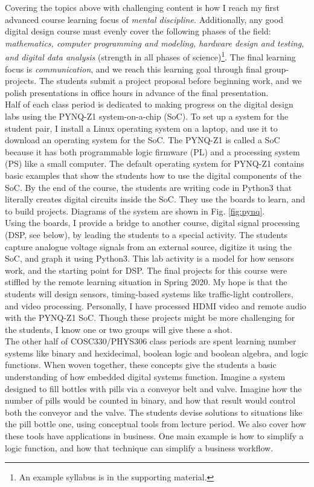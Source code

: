 \documentclass[../../../main.tex]{subfiles}
\begin{document}
Covering the topics above with challenging content is how I reach my first advanced course learning focus of \textit{mental discipline.}  Additionally, any good digital design course must evenly cover the following phases of the field: \textit{mathematics, computer programming and modeling, hardware design and testing, and digital data analysis} (strength in all phases of science)\footnote{An example syllabus is in the supporting material.}.  The final learning focus is \textit{communication}, and we reach this learning goal through final group-projects.  The students submit a project proposal before beginning work, and we polish presentations in office hours in advance of the final presentation.
\\
\vspace{0.25cm}
Half of each class period is dedicated to making progress on the digital design labs using the PYNQ-Z1 system-on-a-chip (SoC).  To set up a system for the student pair, I install a Linux operating system on a laptop, and use it to download an operating system for the SoC.  The PYNQ-Z1 is called a SoC because it has both programmable logic firmware (PL) and a processing system (PS) like a small computer.  The default operating system for PYNQ-Z1 contains basic examples that show the students how to use the digital components of the SoC.  By the end of the course, the students are writing code in Python3 that literally creates digital circuits inside the SoC.  They use the boards to learn, and to build projects.  Diagrams of the system are shown in Fig. \ref{fig:pynq}.
\\
\vspace{0.25cm}
Using the boards, I provide a bridge to another course, digital signal processing (DSP, see below), by leading the students to a special activity.  The students capture analogue voltage signals from an external source, digitize it using the SoC, and graph it using Python3.  This lab activity is a model for how sensors work, and the starting point for DSP.  The final projects for this course were stiffled by the remote learning situation in Spring 2020.  My hope is that the students will design sensors, timing-based systems like traffic-light controllers, and video processing.  Personally, I have processed HDMI video and remote audio with the PYNQ-Z1 SoC.  Though these projects might be more challenging for the students, I know one or two groups will give these a shot.
\\
\vspace{0.25cm}
The other half of COSC330/PHYS306 class periods are spent learning number systems like binary and hexidecimal, boolean logic and boolean algebra, and logic functions.  When woven together, these concepts give the students a basic understanding of how embedded digital systems function.  Imagine a system designed to fill bottles with pills via a conveyor belt and valve.  Imagine how the number of pills would be counted in binary, and how that result would control both the conveyor and the valve.  The students devise solutions to situations like the pill bottle one, using conceptual tools from lecture period.  We also cover how these tools have applications in business.  One main example is how to simplify a logic function, and how that technique can simplify a business workflow.
\end{document}
